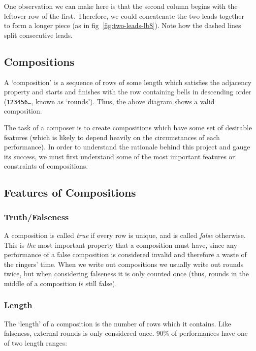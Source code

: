 \documentclass[12pt]{article}
\newcommand{\row}[1]{\texttt{#1}}
\begin{document}
One observation we can make here is that the second column begins with the leftover row of the
first.  Therefore, we could concatenate the two leads together to form a longer piece (as in
fig~\ref{fig:two-leads-lb8}). Note how the dashed lines split consecutive leads.

\subsection{Compositions}

A `composition' is a sequence of rows of some length which satisfies the adjacency property and
starts and finishes with the row containing bells in descending order (\row{123456\ldots}, known as
`rounds').  Thus, the above diagram shows a valid composition.

The task of a composer is to create compositions which have some set of desirable features (which is
likely to depend heavily on the circumstances of each performance).  In order to understand the
rationale behind this project and gauge its success, we must first understand some of the most
important features or constraints of compositions.

\subsection{Features of Compositions}

\subsubsection{Truth/Falseness}

A composition is called \emph{true} if every row is unique, and is called \emph{false} otherwise.
This is \emph{the} most important property that a composition must have, since any performance of a
false composition is considered invalid and therefore a waste of the ringers' time.  When we write
out compositions we usually write out rounds twice, but when considering falseness it is only
counted once (thus, rounds in the middle of a composition is still false).

\subsubsection{Length}

The `length' of a composition is the number of rows which it contains.  Like falseness, external
rounds is only considered once.  90\% of performances have one of two length ranges:
\end{document}
